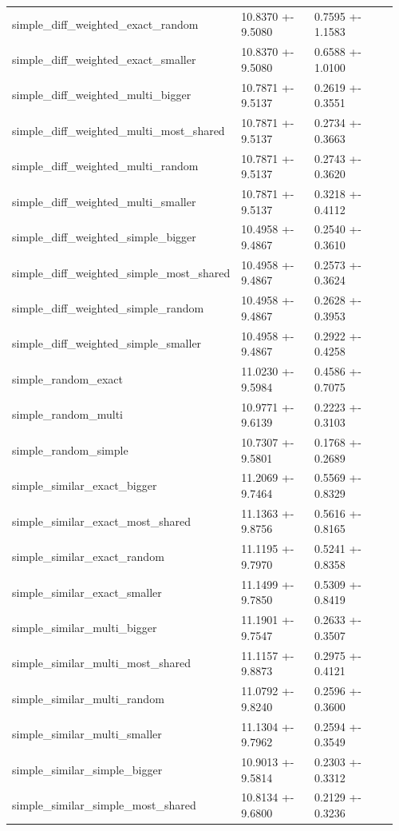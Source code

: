 \begin{table}
\begin{tabular}{p{0.42\linewidth}p{0.24\linewidth}p{0.30\linewidth}}
simple\_diff\_weighted\_exact\_random & 10.8370 +- 9.5080 & 0.7595 +- 1.1583 \\
simple\_diff\_weighted\_exact\_smaller & 10.8370 +- 9.5080 & 0.6588 +- 1.0100 \\
simple\_diff\_weighted\_multi\_bigger & 10.7871 +- 9.5137 & 0.2619 +- 0.3551 \\
simple\_diff\_weighted\_multi\_most\_shared & 10.7871 +- 9.5137 & 0.2734 +- 0.3663 \\
simple\_diff\_weighted\_multi\_random & 10.7871 +- 9.5137 & 0.2743 +- 0.3620 \\
simple\_diff\_weighted\_multi\_smaller & 10.7871 +- 9.5137 & 0.3218 +- 0.4112 \\
simple\_diff\_weighted\_simple\_bigger & 10.4958 +- 9.4867 & 0.2540 +- 0.3610 \\
simple\_diff\_weighted\_simple\_most\_shared & 10.4958 +- 9.4867 & 0.2573 +- 0.3624 \\
simple\_diff\_weighted\_simple\_random & 10.4958 +- 9.4867 & 0.2628 +- 0.3953 \\
simple\_diff\_weighted\_simple\_smaller & 10.4958 +- 9.4867 & 0.2922 +- 0.4258 \\
simple\_random\_exact & 11.0230 +- 9.5984 & 0.4586 +- 0.7075 \\
simple\_random\_multi & 10.9771 +- 9.6139 & 0.2223 +- 0.3103 \\
simple\_random\_simple & 10.7307 +- 9.5801 & 0.1768 +- 0.2689 \\
simple\_similar\_exact\_bigger & 11.2069 +- 9.7464 & 0.5569 +- 0.8329 \\
simple\_similar\_exact\_most\_shared & 11.1363 +- 9.8756 & 0.5616 +- 0.8165 \\
simple\_similar\_exact\_random & 11.1195 +- 9.7970 & 0.5241 +- 0.8358 \\
simple\_similar\_exact\_smaller & 11.1499 +- 9.7850 & 0.5309 +- 0.8419 \\
simple\_similar\_multi\_bigger & 11.1901 +- 9.7547 & 0.2633 +- 0.3507 \\
simple\_similar\_multi\_most\_shared & 11.1157 +- 9.8873 & 0.2975 +- 0.4121 \\
simple\_similar\_multi\_random & 11.0792 +- 9.8240 & 0.2596 +- 0.3600 \\
simple\_similar\_multi\_smaller & 11.1304 +- 9.7962 & 0.2594 +- 0.3549 \\
simple\_similar\_simple\_bigger & 10.9013 +- 9.5814 & 0.2303 +- 0.3312 \\
simple\_similar\_simple\_most\_shared & 10.8134 +- 9.6800 & 0.2129 +- 0.3236 \\

\end{tabular}
\end{table}
